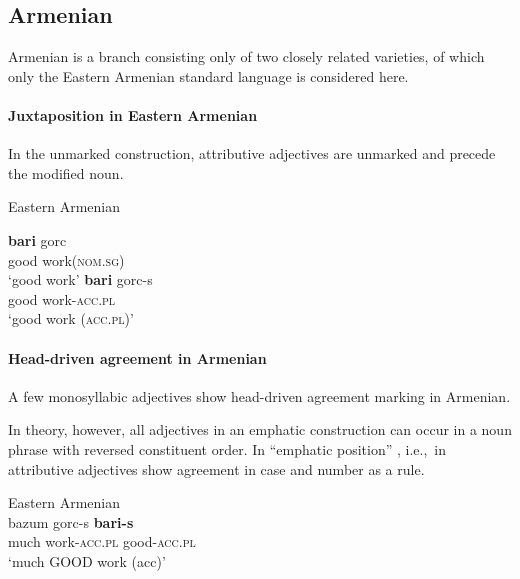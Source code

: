 \subsection{Armenian}\label{armenian-synch}
Armenian is a branch consisting only of two closely related varieties, of which only the Eastern Armenian standard language is considered here.

\paragraph*{Juxtaposition in Eastern Armenian} 
In the unmarked construction, attributive adjectives are unmarked and precede the modified noun.
\begin{exe}
\ex \rm{Eastern Armenian \citep{ajello1998}}
\begin{xlist}
\ex 
\gll	\textbf{bari} gorc\\
	good work(\textsc{nom.sg})\\
\glt	‘good work’
\ex 
\gll	\textbf{bari} gorc-s\\
	good work-\textsc{acc.pl}\\
\glt	‘good work (\textsc{acc.pl})’
\end{xlist}
\end{exe}

\paragraph*{Head\hyp{}driven agreement in Armenian}
A few monosyllabic adjectives show head\hyp{}driven agreement marking in Armenian. 

In theory, however, all adjectives in an emphatic construction can occur in a noun phrase with reversed constituent order. In “emphatic position” \cite[224]{ajello1998}, i.e.,~in  attributive adjectives show agreement in case and number as a rule.
\begin{exe}
\ex \rm{Eastern Armenian \citep[224]{ajello1998}}\\
\gll	bazum gorc-s \textbf{bari-s}\\
	much work-\textsc{acc.pl} good-\textsc{acc.pl}\\
\glt	‘much GOOD work (acc)’
\end{exe}

